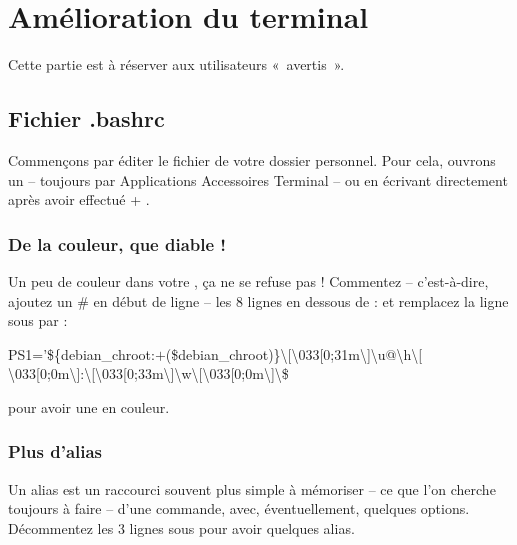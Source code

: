 \section{Amélioration du terminal}
\label{RefAmelioTerminal}
Cette partie est à réserver aux utilisateurs «~avertis~».\par
\subsection{Fichier .bashrc}
Commençons par éditer le fichier  de votre dossier personnel. Pour cela, ouvrons un  -- toujours par Applications \FlecheDroite Accessoires \FlecheDroite Terminal -- ou en écrivant directement après avoir effectué  +  .\par
\subsubsection{De la couleur, que diable !}
Un peu de couleur dans votre , ça ne se refuse pas ! Commentez -- c'est-à-dire, ajoutez un \# en début de ligne -- les 8 lignes en dessous de :
et remplacez la ligne sous
par :
	\begin{breakbox}%
		\begin{otherlanguage}{english}%
			PS1='\$\{debian\_chroot:$+$(\$debian\_chroot)\}\textbackslash{}[\textbackslash{}033[0;31m\textbackslash{}]\textbackslash{}u@\textbackslash{}h\textbackslash{}[\\\textbackslash{}033[0;0m\textbackslash{}]:\textbackslash{}[\textbackslash{}033[0;33m\textbackslash{}]\textbackslash{}w\textbackslash{}[\textbackslash{}033[0;0m\textbackslash{}]\textbackslash{}\$%
		\end{otherlanguage}%
	\end{breakbox}%
pour avoir une  en couleur.
\subsubsection{Plus d'alias}
Un alias est un raccourci souvent plus simple à mémoriser -- ce que l'on cherche toujours à faire -- d'une commande, avec, éventuellement, quelques options. Décommentez les 3 lignes sous
pour avoir quelques alias.
